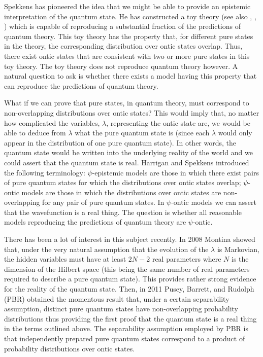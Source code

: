 \documentclass[12pt]{article}
\begin{document}
Spekkens has pioneered the idea that we might be able to provide an epistemic interpretation of the quantum state.   He has constructed a toy theory \cite{spekkens2007evidence} (see also
\cite{hardy1999disentangling}, \cite{coecke2011toy, coecke2011phase}, \cite{bartlett2011reconstruction}) which is capable of reproducing a substantial fraction of the predictions of quantum
theory.  This toy theory has the property that, for different pure states in the theory, the corresponding distribution over ontic states overlap.  Thus, there exist ontic states that are
consistent with two or more pure states in this toy theory.   The toy theory does not reproduce quantum theory however.  A natural question to ask is whether there exists a model having this
property that can reproduce the predictions of quantum theory.

What if we can prove that pure states, in quantum theory, must correspond to non-overlapping distributions over ontic states?  This would imply that, no matter how complicated the variables,
$\lambda$,  representing the ontic state are, we would be able to deduce from $\lambda$ what the pure quantum state is (since each $\lambda$ would only appear in the distribution of one pure
quantum state).  In other words, the quantum state would be written into the underlying reality of the world and we could assert that the quantum state is real.  Harrigan and Spekkens
\cite{harrigan2010einstein} introduced the following terminology: $\psi$-epistemic models are those in which there exist pairs of pure quantum states for which the distributions over ontic
states overlap; $\psi$-ontic models are those in which the distributions over ontic states are non-overlapping for any pair of pure quantum states.  In $\psi$-ontic models we can assert that
the wavefunction is a real thing. The question is whether all reasonable models reproducing the predictions of quantum theory are $\psi$-ontic.

There has been a lot of interest in this subject recently.  In 2008 Montina \cite{montina2008exponential, montina2011state} showed that, under the very natural assumption that the evolution
of the $\lambda$ is Markovian, the hidden variables must have at least $2N-2$ real parameters where $N$ is the dimension of the Hilbert space (this being the same number of real parameters
required to describe a pure quantum state).  This provides rather strong evidence for the reality of the quantum state.   Then, in 2011 Pusey, Barrett, and Rudolph (PBR)
\cite{pusey2011quantum} obtained the momentous result that, under a certain separability assumption, distinct pure quantum states have non-overlapping probability distributions thus
providing the first proof that the quantum state is a real thing in the terms outlined above.  The separability assumption employed by PBR is that independently prepared pure quantum states
correspond to a product of probability distributions over ontic states.
\end{document}

